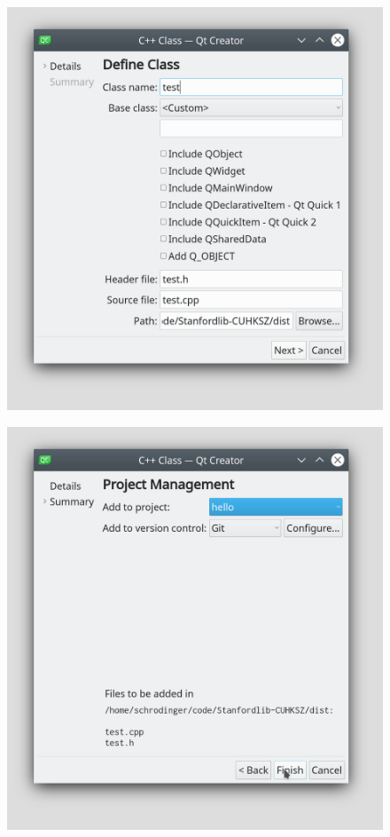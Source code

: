 \documentclass[a4paper,12pt]{report}
\begin{document}
\begin{figure}[H] 
	\centering
	\includegraphics[width=\linewidth]{qt_a1}
\end{figure}

\begin{figure}[H] 
	\centering
	\includegraphics[width=\linewidth]{qt_a2}
\end{figure}
 
\end{document}
